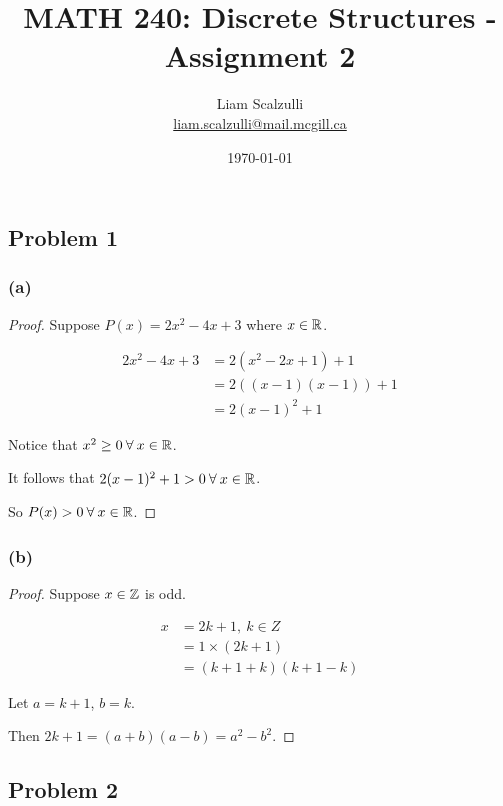 \documentclass[10pt]{article}
\title{MATH 240: Discrete Structures - Assignment 2}
\author{Liam Scalzulli\\
\href{mailto:liam.scalzulli@mail.mcgill.ca}{liam.scalzulli@mail.mcgill.ca}}
\date{\today}
\begin{document}
\maketitle

\subsection*{Problem 1}

\subsubsection*{(a)}

\begin{proof}
  Suppose $P(x) = 2x^2 - 4x + 3$ where $x \in \mathbb{R}$.

  \begin{align*}
    2x^2 - 4x + 3 &= 2(x^2 - 2x + 1) + 1 \\
      &= 2((x - 1)(x - 1)) + 1 \\
      &= 2(x - 1)^2 + 1
  \end{align*}

  \noindent
  Notice that $x^2 \ge 0 \: \forall \: x \in \mathbb{R}$.
  \spacing

  \noindent
  It follows that $2(x - 1)^2 + 1 > 0 \: \forall \: x \in \mathbb{R}$.
  \spacing

  \noindent
  So $P(x) > 0 \: \forall \: x \in \mathbb{R}$.
\end{proof}

\subsubsection*{(b)}

\begin{proof}
  Suppose $x \in \mathbb{Z}$ is odd.

  \begin{align*}
    x &= 2k + 1, \: k \in Z \\
      &= 1 \times (2k + 1) \\
      &= (k + 1 + k)(k + 1 - k)
  \end{align*}

  \noindent
  Let $a = k + 1$, $b = k$. \spacing

  \noindent
  Then $2k + 1 = (a + b)(a - b) = a^2 - b^2.$
\end{proof}

\newpage
\subsection*{Problem 2}
\end{document}
